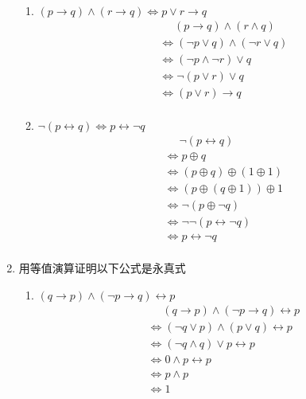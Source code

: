\documentclass[UTF8]{ctexart}
\begin{document}
\begin{enumerate}
\begin{enumerate}
            \item  $( p \rightarrow q) \wedge (r \rightarrow q) \Leftrightarrow p \vee r \rightarrow q$
            \[
                \begin{aligned}
                    &\mathrel{\phantom{=}} (p\rightarrow q) \wedge (r\wedge q)\\
                    &\Leftrightarrow (\neg p \vee q) \wedge (\neg r \vee q)\\
                    &\Leftrightarrow (\neg p \wedge \neg r) \vee q\\
                    &\Leftrightarrow \neg(p \vee r)\vee q\\
                    &\Leftrightarrow (p\vee r)\rightarrow q\\
                \end{aligned}
            \]
            \item  $\neg( p \leftrightarrow q) \Leftrightarrow p \leftrightarrow \neg q$
            \[
                \begin{aligned}
                    &\mathrel{\phantom{=}}\neg (p\leftrightarrow q)\\
                    &\Leftrightarrow p \oplus q\\
                    &\Leftrightarrow (p \oplus q )\oplus (1 \oplus 1)\\
                    &\Leftrightarrow (p \oplus (q\oplus 1))\oplus 1\\
                    &\Leftrightarrow \neg (p \oplus \neg q)\\
                    &\Leftrightarrow \neg \neg (p \leftrightarrow \neg q)\\
                    &\Leftrightarrow p \leftrightarrow \neg q\\
                \end{aligned}    
            \]
        \end{enumerate}
    
    \item 用等值演算证明以下公式是永真式
    \begin{enumerate}
        \item $( q \rightarrow  p ) \wedge  ( \neg p \rightarrow  q ) \leftrightarrow p$
        \[    
            \begin{aligned}
                &\mathrel{\phantom{=}} (q\rightarrow p)\wedge (\neg p \rightarrow q) \leftrightarrow p\\
                &\Leftrightarrow (\neg q \vee p)\wedge (p \vee q) \leftrightarrow p\\
                &\Leftrightarrow (\neg q \wedge q)\vee p \leftrightarrow p\\
                &\Leftrightarrow 0\wedge p \leftrightarrow p\\
                &\Leftrightarrow p\wedge p\\
                &\Leftrightarrow 1\\
            \end{aligned}
        \]


\end{enumerate}
\end{enumerate}
\end{document}
